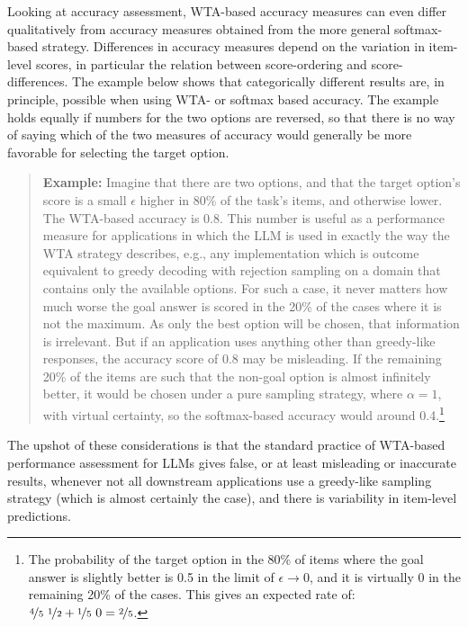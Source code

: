 \documentclass[fleqn]{article}
\begin{document}
Looking at accuracy assessment, WTA-based accuracy measures can even differ qualitatively from accuracy measures obtained from the more general softmax-based strategy.
Differences in accuracy measures depend on the variation in item-level scores, in particular the relation between score-ordering and score-differences.
The example below shows that categorically different results are, in principle, possible when using WTA- or softmax based accuracy.
The example holds equally if numbers for the two options are reversed, so that there is no way of saying which of the two measures of accuracy would generally be more favorable for selecting the target option.
%
\begin{quote}
  \textbf{Example:}
  Imagine that there are two options, and that the target option's score is a small $\epsilon$ higher in 80\% of the task's items, and otherwise lower.
  The WTA-based accuracy is 0.8.
  This number is useful as a performance measure for applications in which the LLM is used in exactly the way the WTA strategy describes, e.g., any implementation which is outcome equivalent to greedy decoding with rejection sampling on a domain that contains only the available options.
  For such a case, it never matters how much worse the goal answer is scored in the 20\% of the cases where it is not the maximum.
  As only the best option will be chosen, that information is irrelevant.
  But if an application uses anything other than greedy-like responses, the accuracy score of 0.8 may be misleading.
  If the remaining 20\% of the items are such that the non-goal option is almost infinitely better, it would be chosen under a pure sampling strategy, where $\alpha = 1$, with virtual certainty, so the softmax-based accuracy would around 0.4.\footnote{The probability of the target option in the 80\% of items where the goal answer is slightly better is 0.5 in the limit of $\epsilon \rightarrow 0$, and it is virtually 0 in the remaining 20\% of the cases. This gives an expected rate of: $\nicefrac{4}{5} \ \nicefrac{1}{2} + \nicefrac{1}{5} \ 0 = \nicefrac{2}{5}$.}
\end{quote}
%
The upshot of these considerations is that the standard practice of WTA-based performance assessment for LLMs gives false, or at least misleading or inaccurate results, whenever not all downstream applications use a greedy-like sampling strategy (which is almost certainly the case), and there is variability in item-level predictions.
\end{document}
